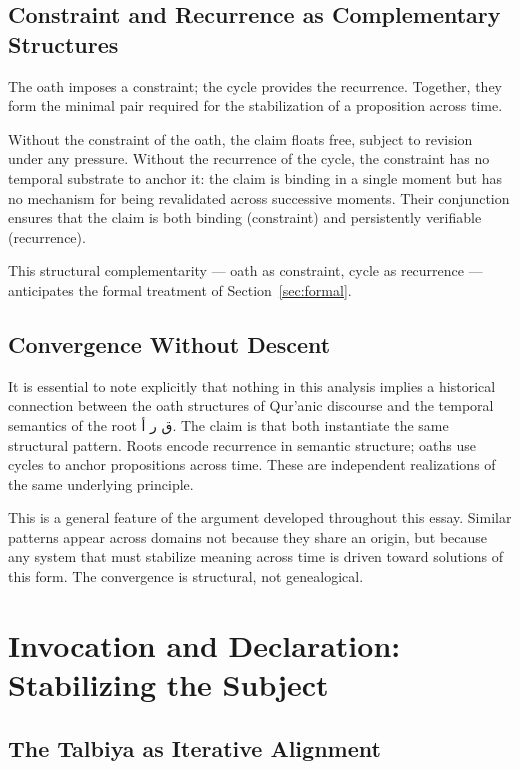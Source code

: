 \documentclass[12pt, oneside]{article}
\newcommand{\AR}[1]{\textarabic{#1}}
\theoremstyle{definition}
\theoremstyle{remark}
\begin{document}
\subsection{Constraint and Recurrence as Complementary Structures}

The oath imposes a constraint; the cycle provides the recurrence.
Together, they form the minimal pair required for the stabilization of a proposition across time.

Without the constraint of the oath, the claim floats free, subject to revision under any pressure.
Without the recurrence of the cycle, the constraint has no temporal substrate to anchor it: the claim is binding in a single moment but has no mechanism for being revalidated across successive moments.
Their conjunction ensures that the claim is both binding (constraint) and persistently verifiable (recurrence).

This structural complementarity --- oath as constraint, cycle as recurrence --- anticipates the formal treatment of Section~\ref{sec:formal}.

\subsection{Convergence Without Descent}

It is essential to note explicitly that nothing in this analysis implies a historical connection between the oath structures of Qur'anic discourse and the temporal semantics of the root \AR{ق ر أ}.
The claim is that both instantiate the same structural pattern.
Roots encode recurrence in semantic structure; oaths use cycles to anchor propositions across time.
These are independent realizations of the same underlying principle.

This is a general feature of the argument developed throughout this essay.
Similar patterns appear across domains not because they share an origin, but because any system that must stabilize meaning across time is driven toward solutions of this form.
The convergence is structural, not genealogical.

\section{Invocation and Declaration: Stabilizing the Subject}

\subsection{The Talbiya as Iterative Alignment}
\end{document}
